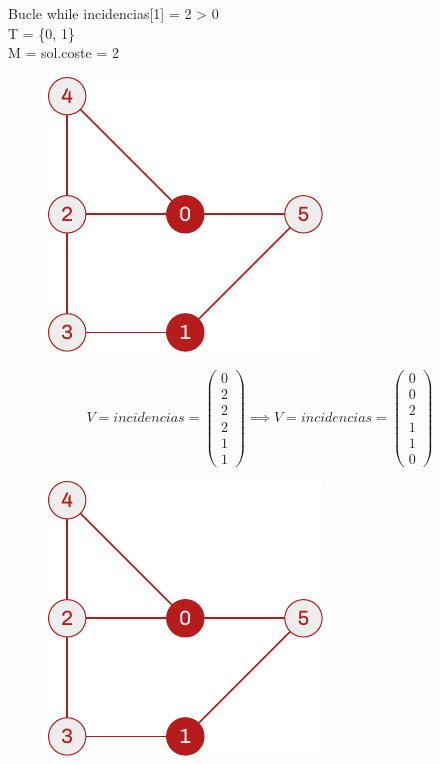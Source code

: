 \documentclass[spanish]{beamer}
\begin{document}
\begin{frame}{Bucle while}
	incidencias[1] = 2 > 0\\
	T = \{0, 1\}\\
	M = sol.coste = 2
	\begin{figure}[H]
		\centering \includegraphics{./img/grafo-ejemplo-2-pres.pdf}
	\end{figure}
\end{frame}

\begin{frame}{}
	$$  V = incidencias =
	\begin{pmatrix}
	  0 \\
	  2 \\
	  2 \\
	  2 \\
	  1 \\
	  1
	\end{pmatrix} \implies  V = incidencias =
	\begin{pmatrix}
	  0 \\
	  0 \\
	  2 \\
	  1 \\
	  1 \\
	  0
	\end{pmatrix}$$
	\begin{figure}[H]
		\centering \includegraphics{./img/grafo-ejemplo-2-pres.pdf}
	\end{figure}
\end{frame}
\end{document}
